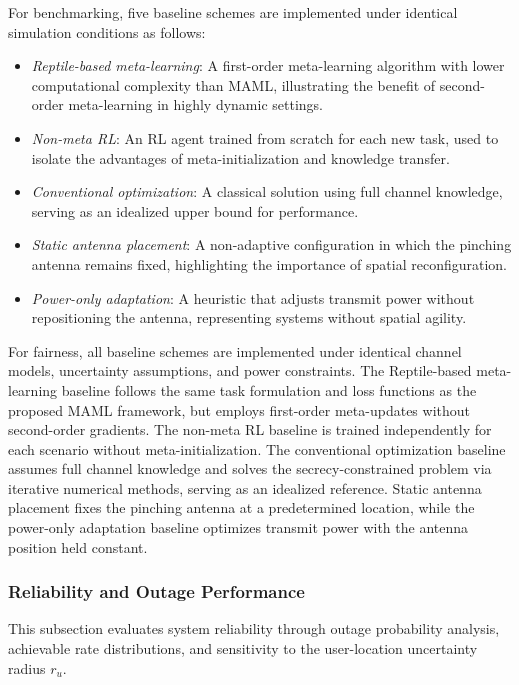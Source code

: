 \documentclass[journal,10pt]{IEEEtran}
\begin{document}
For benchmarking, five baseline schemes are implemented under identical simulation conditions as follows:
\begin{itemize}
\item \textit{Reptile-based meta-learning}: A first-order meta-learning algorithm with lower computational complexity than MAML, illustrating the benefit of second-order meta-learning in highly dynamic settings.
\item \textit{Non-meta RL}: An RL agent trained from scratch for each new task, used to isolate the advantages of meta-initialization and knowledge transfer.
\item \textit{Conventional optimization}: A classical solution using full channel knowledge, serving as an idealized upper bound for performance.
\item \textit{Static antenna placement}: A non-adaptive configuration in which the pinching antenna remains fixed, highlighting the importance of spatial reconfiguration.
\item \textit{Power-only adaptation}: A heuristic that adjusts transmit power without repositioning the antenna, representing systems without spatial agility.
\end{itemize}


For fairness, all baseline schemes are implemented under identical channel models, uncertainty assumptions, and power constraints. The Reptile-based meta-learning baseline follows the same task formulation and loss functions as the proposed MAML framework, but employs first-order meta-updates without second-order gradients. The non-meta RL baseline is trained independently for each scenario without meta-initialization. The conventional optimization baseline assumes full channel knowledge and solves the secrecy-constrained problem via iterative numerical methods, serving as an idealized reference. Static antenna placement fixes the pinching antenna at a predetermined location, while the power-only adaptation baseline optimizes transmit power with the antenna position held constant.


\subsubsection{Reliability and Outage Performance}
This subsection evaluates system reliability through outage probability analysis, achievable rate distributions, and sensitivity to the user-location uncertainty radius $r_u$.
\end{document}
